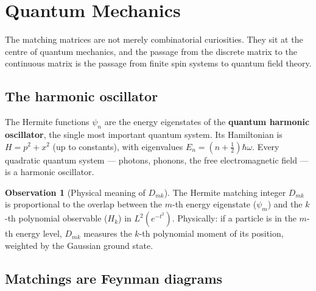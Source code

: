 \documentclass[11pt,a4paper]{article}
\theoremstyle{plain}
\theoremstyle{definition}
\newtheorem{observation}[theorem]{Observation}
\begin{document}
\section{Quantum Mechanics}

\begin{tcolorbox}[breakable, colback=yellow!10, colframe=yellow!10,
  boxrule=0pt, sharp corners]
The matching matrices are not merely combinatorial curiosities. They
sit at the centre of quantum mechanics, and the passage from the
discrete matrix to the continuous matrix is the passage from finite
spin systems to quantum field theory.
\end{tcolorbox}

\subsection{The harmonic oscillator}

The Hermite functions $\psi_n$ are the energy eigenstates of the
\textbf{quantum harmonic oscillator}, the single most important
quantum system. Its Hamiltonian is $H = p^2 + x^2$ (up to
constants), with eigenvalues $E_n = (n + \tfrac12)\hbar\omega$.
Every quadratic quantum system --- photons, phonons, the free
electromagnetic field --- is a harmonic oscillator.

\begin{tcolorbox}[colback=black!5, colframe=black!5, boxrule=0pt,
  sharp corners]
\begin{observation}[Physical meaning of $D_{mk}$]\label{obs:Dmk}
The Hermite matching integer $D_{mk}$ is proportional to the overlap
between the $m$-th energy eigenstate ($\psi_m$) and the $k$-th
polynomial observable ($H_k$) in $L^2(e^{-t^2})$. Physically: if a
particle is in the $m$-th energy level, $D_{mk}$ measures the $k$-th
polynomial moment of its position, weighted by the Gaussian ground
state.
\end{observation}
\end{tcolorbox}

\subsection{Matchings are Feynman diagrams}
\end{document}
